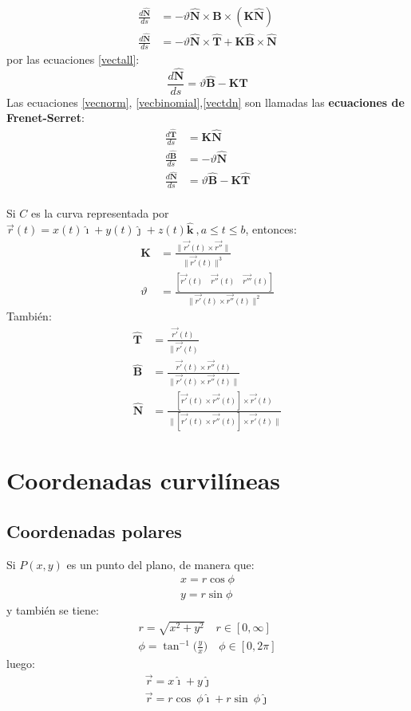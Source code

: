 \documentclass[a4paper]{article}
\newcommand{\ihat}{\boldsymbol{\hat{\imath}}}
\newcommand{\jhat}{\boldsymbol{\hat{\jmath}}}
\newcommand{\khat}{\boldsymbol{\hat{\bm{k}}}}
\begin{document}
\begin{align*}
\frac{d\mathbf{\hat{N}}}{ds}&=-\vartheta\mathbf{\hat{N}}\times\mathbf{\hat{B}}\times(\mathbf{K}\mathbf{\hat{N}})\\
\frac{d\mathbf{\hat{N}}}{ds}&=-\vartheta\mathbf{\hat{N}}\times\mathbf{\hat{T}}+\mathbf{K}\mathbf{\hat{B}}\times\mathbf{\hat{N}}
\end{align*}
por las ecuaciones \ref{vectall}:
\begin{equation}
\label{vectdn}
\frac{d\mathbf{\hat{N}}}{ds}=\vartheta\mathbf{\hat{B}}-\mathbf{K}\mathbf{\hat{T}}
\end{equation}
Las ecuaciones \ref{vecnorm}, \ref{vecbinomial},\ref{vectdn} son llamadas las \textbf{ecuaciones de Frenet-Serret}:
\begin{align*}
\frac{d\mathbf{\hat{T}}}{ds}&=\mathbf{K}\mathbf{\hat{N}}\\
\frac{d\mathbf{\hat{B}}}{ds}&=-\vartheta\mathbf{\hat{N}}\\
\frac{d\mathbf{\hat{N}}}{ds}&=\vartheta\mathbf{\hat{B}}-\mathbf{K}\mathbf{\hat{T}}
\end{align*}\\
Si $C$ es la curva representada por $\vec{r}(t)=x(t)\ihat+y(t)\jhat+z(t)\khat\ ,a\leq t\leq b$, entonces:
\begin{align*}
\mathbf{K}&=\frac{\lVert \vec{r'}(t)\times\vec{r''}\rVert}{\lVert \vec{r'}(t)\rVert^3}\\
\vartheta&=\frac{[\vec{r'}(t)\quad\vec{r''}(t)\quad\vec{r'''}(t)]}{\lVert \vec{r'}(t)\times\vec{r''}(t)\rVert^2}
\end{align*}
También:
\begin{align*}
\mathbf{\hat{T}}&=\frac{\vec{r'}(t)}{\lVert \vec{r'}(t)}\\
\mathbf{\hat{B}}&=\frac{\vec{r'}(t)\times\vec{r''}(t)}{\rVert \vec{r'}(t)\times\vec{r''}(t)\lVert}\\
\mathbf{\hat{N}}&=\frac{[\vec{r'}(t)\times\vec{r''}(t)]\times\vec{r'}(t)}{\lVert [\vec{r'}(t)\times\vec{r''}(t)]\times\vec{r'}(t)\rVert}
\end{align*}
\section{Coordenadas curvilíneas}
\subsection{Coordenadas polares}
Si $P(x,y)$ es un punto del plano, de manera que:
\begin{gather*}
x=r\cos \phi\\
y=r\sin \phi
\end{gather*}
y también se tiene:
\begin{gather*}
r=\sqrt{x^2+y^2}\quad r\in[0,\infty]\\
\phi=\tan^{-1}\Big(\frac{y}{x}\Big)\quad\phi\in[0,2\pi] 
\end{gather*}
luego:
\begin{gather}
\tag{Sistema cartesiano}
\vec{r}=x\ihat+y\jhat\\
\tag{Sistema polar}
\vec{r}=r\cos\ \phi\ihat+r\sin\ \phi\jhat
\end{gather}
\end{document}
